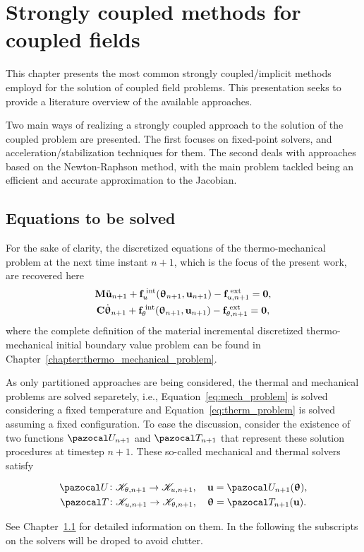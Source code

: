 \chapter{Strongly coupled methods for coupled fields}

This chapter presents the most common strongly coupled/implicit methods employd for the solution of coupled field problems.
This presentation seeks to provide a literature overview of the available approaches.

Two main ways of realizing a strongly coupled approach to the solution of the coupled problem are presented.
The first focuses on fixed-point solvers, and acceleration/stabilization techniques for them.
The second deals with approaches based on the Newton-Raphson method, with the main problem tackled being an efficient and accurate approximation to the Jacobian.

\section{Equations to be solved}

For the sake of clarity, the discretized equations of the thermo-mechanical problem at the next time instant \(n+1\), which is the focus of the present work, are recovered here
\begin{gather}
    \mathbf M \ddot{\mathbf u}_{n+1} +\mathbf f_u^\text{\;int}(\bm \uptheta_{n+1}, \mathbf u_{n+1})-\mathbf f^\text{\;ext}_{u,n+1}=\mathbf 0, \label{eq:mech_problem} \\
    \mathbf C \dot{\bm \uptheta}_{n+1} +\mathbf f_\theta^\text{\;int}(\bm \uptheta_{n+1}, \mathbf u_{n+1})-\mathbf f^\text{\;ext}_{\theta,n+1}=\mathbf 0, \label{eq:therm_problem}
\end{gather}
where the complete definition of the material incremental discretized thermo-mechanical initial boundary value problem can be found in Chapter~\ref{chapter:thermo_mechanical_problem}.

As only partitioned approaches are being considered, the thermal and mechanical problems are solved separetely, i.e., Equation~\eqref{eq:mech_problem} is solved considering a fixed temperature and Equation~\eqref{eq:therm_problem} is solved assuming a fixed configuration.
To ease the discussion, consider the existence of two functions \(\pazocal U_{n+1}\) and \(\pazocal T_{n+1}\) that represent these solution procedures at timestep \(n+1\).
These so-called mechanical and thermal solvers satisfy
\begin{highlight}[innertopmargin=-5pt]
\begin{gather}
  \pazocal U\colon \mathscr K_{\theta, n+1}\to \mathscr K_{u,n+1},\quad \mathbf u = \pazocal U_{n+1}(\bm \uptheta),\\
  \pazocal T\colon \mathscr K_{u,n+1}\to \mathscr K_{\theta, n+1},\quad \bm \uptheta = \pazocal T_{n+1}(\mathbf u).
\end{gather}
\end{highlight}
See Chapter~\ref{} for detailed information on them.
In the following the subscripts on the solvers will be droped to avoid clutter.

